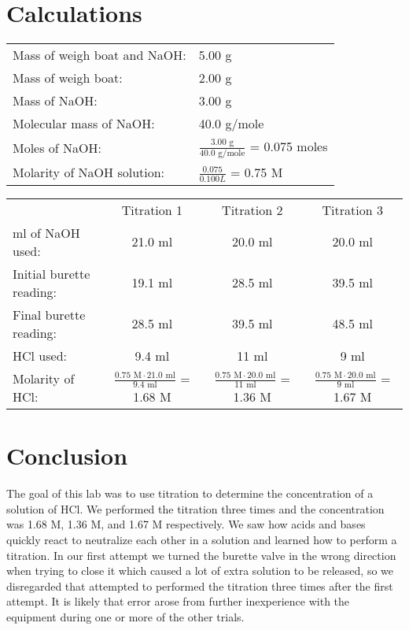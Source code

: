 \documentclass[12pt]{article}
\begin{document}
    \section*{Calculations}
    \begin{table}[H]
        \renewcommand{\arraystretch}{1.6}
        \begin{tabular}{ll}
            Mass of weigh boat and NaOH: & 5.00 g\\
            Mass of weigh boat: & 2.00 g\\
            Mass of NaOH: & 3.00 g\\
            Molecular mass of NaOH: & 40.0 g/mole\\
            Moles of NaOH: & \(\frac{3.00\text{ g}}{40.0\text{ g/mole}}\) = 0.075 moles\\
            Molarity of NaOH solution: & \(\frac{0.075}{0.100 L}\) = 0.75 M\\
        \end{tabular}
    \end{table}
    \begin{table}[H]
        \renewcommand{\arraystretch}{1.6}
        \begin{tabular}{lccc}
            & Titration 1 & Titration 2 & Titration 3\\
            ml of NaOH used: & 21.0 ml & 20.0 ml & 20.0 ml\\
            Initial burette reading: & 19.1 ml & 28.5 ml & 39.5 ml\\
            Final burette reading: & 28.5 ml & 39.5 ml & 48.5 ml\\
            HCl used: & 9.4 ml & 11 ml & 9 ml\\
            Molarity of HCl: & \(\frac{0.75 \text{ M}\cdot21.0\text{ ml}}{9.4\text{ ml}}\) = 1.68 M & \(\frac{0.75 \text{ M}\cdot20.0\text{ ml}}{11\text{ ml}}\) = 1.36 M & \(\frac{0.75 \text{ M}\cdot20.0\text{ ml}}{9\text{ ml}}\) = 1.67 M
        \end{tabular}
    \end{table}
    \section*{Conclusion}
        The goal of this lab was to use titration to determine the concentration of a solution of HCl. We performed the titration three times and the concentration was 1.68 M, 1.36 M, and 1.67 M respectively. We saw how acids and bases quickly react to neutralize each other in a solution and learned how to perform a titration. In our first attempt we turned the burette valve in the wrong direction when trying to close it which caused a lot of extra solution to be released, so we disregarded that attempted to performed the titration three times after the first attempt. It is likely that error arose from further inexperience with the equipment during one or more of the other trials. 
\end{document}
